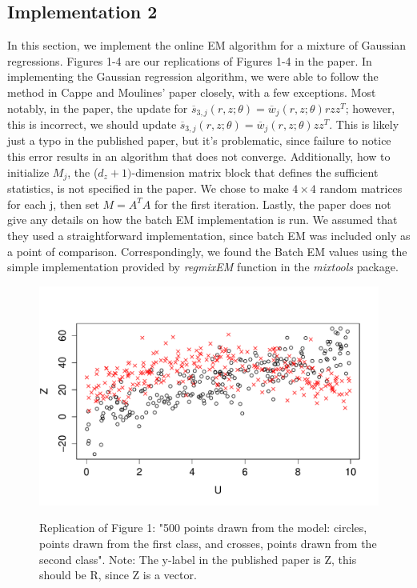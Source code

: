 \documentclass[12pt]{article}
\begin{document}
\subsection{Implementation 2}
In this section, we implement the online EM algorithm for a mixture of Gaussian regressions. Figures 1-4 are our replications of Figures 1-4 in the paper. In implementing the Gaussian regression  algorithm, we were able to follow the method in Cappe and Moulines' paper closely, with a few exceptions. Most notably, in the paper, the update for $\overline{s}_{3,j}(r,z;\theta) = \overline{w}_{j}(r,z;\theta)rzz^{T}$; however, this is incorrect, we should update $\overline{s}_{3,j}(r,z;\theta) = \overline{w}_{j}(r,z;\theta)zz^{T}$. This is likely just a typo in the published paper, but it's problematic, since failure to notice this error results in an algorithm that does not converge. Additionally, how to  initialize $M_{j}$, the ($d_{z} + 1)$-dimension matrix block that defines the sufficient statistics, is not specified in the paper. We chose to make $4 \times 4$ random matrices for each j, then set $M = A^{T}A$ for the first iteration. Lastly, the paper does not give any details on how the batch EM implementation is run. We assumed that they used a straightforward implementation, since batch EM was included only as a point of comparison. Correspondingly, we found the Batch EM values using the simple implementation provided by \textit{regmixEM} function in the \textit{mixtools} package. \\


\begin{figure}[h!]
\centering
\includegraphics[width = .8\textwidth]{fig1.PDF}\\
\caption{Replication of Figure 1: "500 points drawn from the model: circles, points drawn from the first class, and crosses, points drawn from the second class". Note: The y-label in the published paper is Z, this should be R, since Z is a vector.} \label{f1}
\end{figure}
\end{document}
